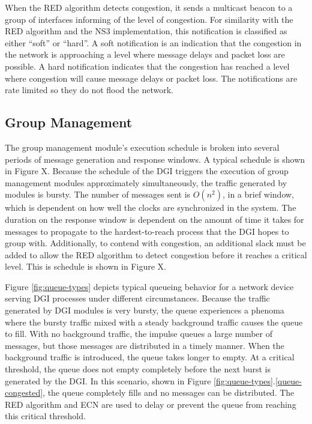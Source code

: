 When the RED algorithm detects congestion, it sends a multicast beacon to a group of interfaces informing of the level of congestion.
For similarity with the RED algorithm and the NS3 implementation, this notification is classified as either ``soft'' or ``hard''.
A soft notification is an indication that the congestion in the network is approaching a level where message delays and packet loss are possible.
A hard notification indicates that the congestion has reached a level where congestion will cause message delays or packet loss.
The notifications are rate limited so they do not flood the network.

\subsection{Group Management}

The group management module's execution schedule is broken into several periods of message generation and response windows.
A typical schedule is shown in Figure X.
Because the schedule of the DGI triggers the execution of group management modules approximately simultaneously, the traffic generated by modules is bursty.
The number of messages sent is $O(n^2)$, in a brief window, which is dependent on how well the clocks are synchronized in the system.
The duration on the response window is dependent on the amount of time it takes for messages to propagate to the hardest-to-reach process that the DGI hopes to group with.
Additionally, to contend with congestion, an additional slack must be added to allow the RED algorithm to detect congestion before it reaches a critical level.
This is schedule is shown in Figure X.

Figure \ref{fig:queue-types} depicts typical queueing behavior for a network device serving DGI processes under different circumstances.
Because the traffic generated by DGI modules is very bursty, the queue experiences a phenoma where the bursty traffic mixed with a steady background traffic causes the queue to fill.
With no background traffic, the impulse queues a large number of messages, but those messages are distributed in a timely manner.
When the background traffic is introduced, the queue takes longer to empty.
At a critical threshold, the queue does not empty completely before the next burst is generated by the DGI.
In this scenario, shown in Figure \ref{fig:queue-types}.\ref{queue-congested}, the queue completely fills and no messages can be distributed.
The RED algorithm and ECN are used to delay or prevent the queue from reaching this critical threshold.

